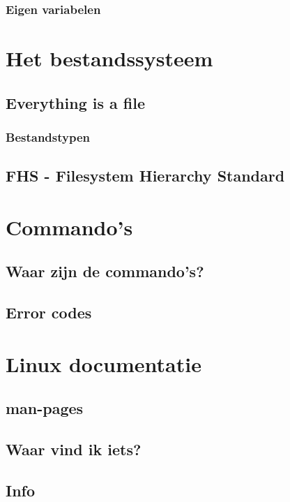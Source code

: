 \documentclass[a4paper,12pt,twoside,openright,titlepage]{book}
\begin{document}
\subsection{Eigen variabelen}


\chapter{Het bestandssysteem}
\section{Everything is a file}

\subsection{Bestandstypen}

\section{FHS - Filesystem Hierarchy Standard}


\chapter{Commando's}

\section{Waar zijn de commando's?}

\section{Error codes}


\chapter{Linux documentatie}

\section{man-pages}

\section{Waar vind ik iets?}

\section{Info}

\end{document}
